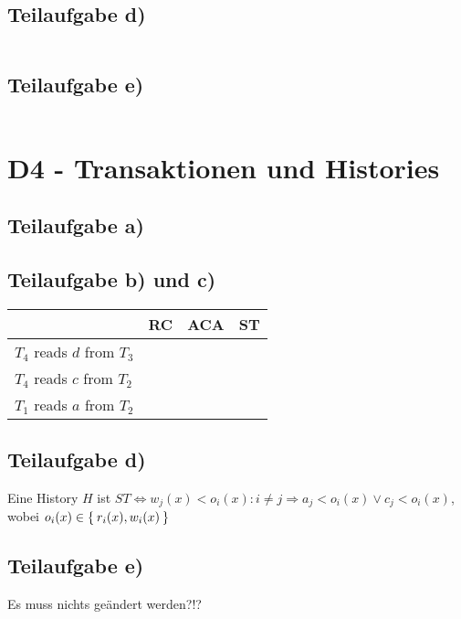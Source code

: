 \documentclass[a4paper,9pt]{scrartcl}
\newcommand{\cmark}{\ding{51}}%
\begin{document}
\subsection{Teilaufgabe d)}
\inputminted[linenos, numbersep=5pt, tabsize=4]{sql}{d3d.sql}

\subsection{Teilaufgabe e)}
\inputminted[linenos, numbersep=5pt, tabsize=4]{sql}{d3e.sql}

\section{D4 - Transaktionen und Histories}
\subsection{Teilaufgabe a)}

\subsection{Teilaufgabe b) und c)}
    \begin{tabular}{l|lll}
    ~                          & RC     & ACA    & ST     \\ \hline
    $T_4$ reads $d$ from $T_3$ & \cmark & \cmark & \cmark \\
    $T_4$ reads $c$ from $T_2$ & \cmark & \cmark & \cmark \\
    $T_1$ reads $a$ from $T_2$ & \cmark & \cmark & \cmark \\
    \end{tabular}

\subsection{Teilaufgabe d)}
Eine History $H$ ist $ST \Leftrightarrow w_j(x) < o_i(x): i \neq j \Rightarrow a_j < o_i(x) \lor c_j < o_i(x)$, wobei $o_i(x) \in \Set{r_i(x), w_i(x)}$

\subsection{Teilaufgabe e)}
Es muss nichts geändert werden?!?
\end{document}
